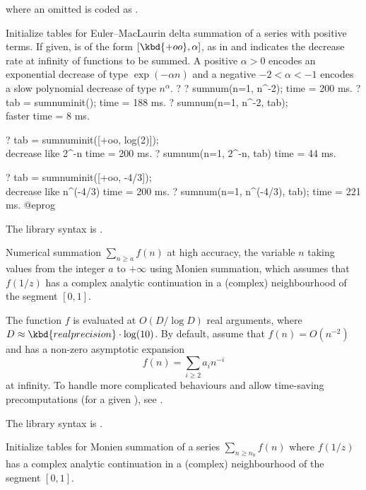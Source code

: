 where an omitted  is coded as .

\label{se:sumnuminit}
Initialize tables for Euler--MacLaurin delta summation of a series with
positive terms. If given,  is of the form $[\kbd{+oo}, \alpha]$,
as in  and indicates the decrease rate at infinity of functions
to be summed. A positive
$\alpha > 0$ encodes an exponential decrease of type $\exp(-\alpha n)$ and
a negative $-2 < \alpha < -1$ encodes a slow polynomial decrease of type
$n^{\alpha}$.
\bprog
? 
? sumnum(n=1, n^-2);
time = 200 ms.
? tab = sumnuminit();
time = 188 ms.
? sumnum(n=1, n^-2, tab); \\ faster
time = 8 ms.

? tab = sumnuminit([+oo, log(2)]); \\ decrease like 2^-n
time = 200 ms.
? sumnum(n=1, 2^-n, tab)
time = 44 ms.

? tab = sumnuminit([+oo, -4/3]); \\ decrease like n^(-4/3)
time = 200 ms.
? sumnum(n=1, n^(-4/3), tab);
time = 221 ms.
@eprog

The library syntax is .

\label{se:sumnummonien}
Numerical summation $\sum_{n\geq a} f(n)$ at high accuracy, the variable
$n$ taking values from the integer $a$ to $+\infty$ using Monien summation,
which assumes that $f(1/z)$ has a complex analytic continuation in a (complex)
neighbourhood of the segment $[0,1]$.

The function $f$ is evaluated at $O(D / \log D)$ real arguments,
where $D \approx \kbd{realprecision} \cdot \log(10)$.
By default, assume that $f(n) = O(n^{-2})$ and has a non-zero asymptotic
expansion
$$f(n) = \sum_{i\geq 2} a_i n^{-i}$$
at infinity. To handle more complicated behaviours and allow time-saving
precomputations (for a given ), see .

The library syntax is .

\label{se:sumnummonieninit}
Initialize tables for Monien summation of a series $\sum_{n\geq n_0}
f(n)$ where $f(1/z)$ has a complex analytic continuation in a (complex)
neighbourhood of the segment $[0,1]$.

